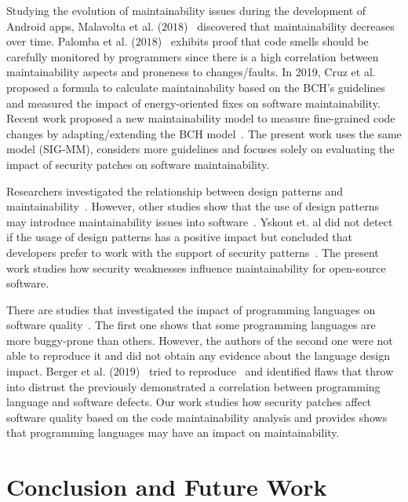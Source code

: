 \documentclass[smallextended]{svjour3}       %
\begin{document}
Studying the evolution 
of maintainability issues during the development of Android apps, Malavolta et al. ($2018$)~\cite{8530041}
discovered that maintainability decreases over time. Palomba et al.
($2018$)~\cite{Palomba:2018:DIM:3231288.3231337} exhibits proof that code smells
should be carefully monitored by programmers since there is a high correlation
between maintainability aspects and proneness to changes/faults. In 2019, Cruz et 
al.~\cite{8919169} proposed a formula to calculate maintainability 
based on the BCH's guidelines and measured the impact of energy-oriented fixes 
on software maintainability. Recent work
proposed a new maintainability model to 
measure fine-grained code changes by adapting/extending the BCH model~\cite{8785997}.
The present work uses the same model (SIG-MM), considers more guidelines and focuses 
solely on evaluating the impact of security patches on software maintainability.

Researchers investigated the relationship between design patterns and
maintainability~\cite{10.1007/978-3-642-35267-6-18}. However, other studies show that 
the use of design patterns may introduce maintainability issues into
software~\cite{4493325}. Yskout et. al did not detect if the usage of 
design patterns has a positive impact but concluded that developers prefer to 
work with the support of security patterns~\cite{8077802}. The present work 
studies how security weaknesses influence maintainability for open-source software.

There are studies that investigated the impact of programming languages on software
quality~\cite{Ray:2014:LSS:2635868.2635922,Ray:2017:LSP:3144574.3126905}. The first
one shows that some programming languages are more buggy-prone than others. However,
the authors of the second one were not able to reproduce it and did not obtain any
evidence about the language design impact. 
Berger et al. ($2019$)~\cite{2019arXiv190110220B} tried to reproduce~\cite{Ray:2014:LSS:2635868.2635922,Ray:2017:LSP:3144574.3126905} 
and identified flaws that throw into distrust the 
previously demonstrated a correlation between programming language and software 
defects. Our work studies how security patches affect software quality based 
on the code maintainability analysis and provides shows that programming languages 
may have an impact on maintainability.

\section{Conclusion and Future Work}\label{sec:conclusions}
\end{document}
